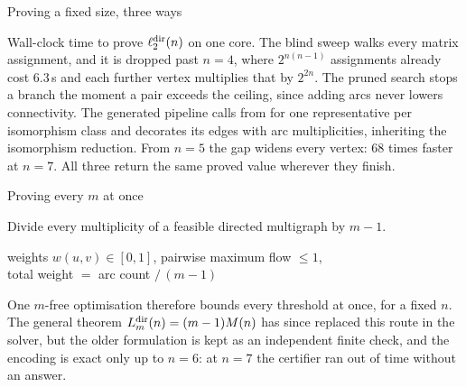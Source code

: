 \documentclass[aspectratio=1610,11pt]{beamer}
\begin{document}
\begin{frame}{Proving a fixed size, three ways}
\vfill
\centering
{\small}

\vspace{14pt}
\begin{minipage}{0.88\textwidth}
{\footnotesize\color{black!60} Wall-clock time to prove $\ell_2^{\mathrm{dir}}(n)$ on one core. The blind sweep walks every matrix assignment, and it is dropped past $n=4$, where $2^{n(n-1)}$ assignments already cost $6.3$\,s and each further vertex multiplies that by $2^{2n}$. The pruned search stops a branch the moment a pair exceeds the ceiling, since adding arcs never lowers connectivity. The generated pipeline calls  from  for one representative per isomorphism class and decorates its edges with arc multiplicities, inheriting the isomorphism reduction. From $n=5$ the gap widens every vertex: $68$ times faster at $n=7$. All three return the same proved value wherever they finish.}
\end{minipage}
\vfill
\end{frame}

\begin{frame}{Proving every $m$ at once}
\vfill
\centering
\begin{minipage}{0.86\textwidth}
{\large Divide every multiplicity of a feasible directed multigraph by $m-1$.}
\end{minipage}

\vspace{18pt}
{\color{KULblauw1}\large weights $w(u,v)\in[0,1]$, \quad pairwise maximum flow $\le1$,}\\[6pt]
{\color{KULblauw1}\large total weight $=$ arc count $/\,(m-1)$}

\vspace{22pt}
\begin{minipage}{0.88\textwidth}
{\footnotesize\color{black!60} One $m$-free optimisation therefore bounds every threshold at once, for a fixed $n$. The general theorem $L_m^{\mathrm{dir}}(n)=(m-1)M(n)$ has since replaced this route in the solver, but the older formulation is kept as an independent finite check, and the encoding is exact only up to $n=6$: at $n=7$ the certifier ran out of time without an answer.}
\end{minipage}
\vfill
\end{frame}

\end{document}
